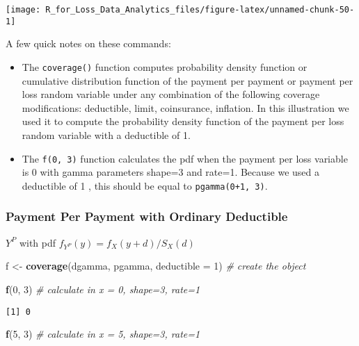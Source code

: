 \documentclass[]{book}
\newenvironment{Shaded}{\begin{snugshade}}{\end{snugshade}}
\newcommand{\KeywordTok}[1]{\textcolor[rgb]{0.13,0.29,0.53}{\textbf{#1}}}
\newcommand{\DataTypeTok}[1]{\textcolor[rgb]{0.13,0.29,0.53}{#1}}
\newcommand{\DecValTok}[1]{\textcolor[rgb]{0.00,0.00,0.81}{#1}}
\newcommand{\StringTok}[1]{\textcolor[rgb]{0.31,0.60,0.02}{#1}}
\newcommand{\CommentTok}[1]{\textcolor[rgb]{0.56,0.35,0.01}{\textit{#1}}}
\newcommand{\NormalTok}[1]{#1}
\providecommand{\tightlist}{%
  \setlength{\itemsep}{0pt}\setlength{\parskip}{0pt}}
\theoremstyle{definition}
\theoremstyle{definition}
\theoremstyle{definition}
\theoremstyle{remark}
\begin{document}
\begin{center}\texttt{[image: R\_for\_Loss\_Data\_Analytics\_files/figure-latex/unnamed-chunk-50-1]} \end{center}

A few quick notes on these commands:

\begin{itemize}
\tightlist
\item
  The \texttt{coverage()} function computes probability density function
  or cumulative distribution function of the payment per payment or
  payment per loss random variable under any combination of the
  following coverage modifications: deductible, limit, coinsurance,
  inflation. In this illustration we used it to compute the probability
  density function of the payment per loss random variable with a
  deductible of 1.
\item
  The \texttt{f(0,\ 3)} function calculates the pdf when the payment per
  loss variable is 0 with gamma parameters shape=3 and rate=1. Because
  we used a deductible of 1 , this should be equal to
  \texttt{pgamma(0+1,\ 3)}.
\end{itemize}

\subsubsection{Payment Per Payment with Ordinary
Deductible}\label{payment-per-payment-with-ordinary-deductible}

\(Y^P\) with pdf \(f_{Y^P}(y) = f_X(y+d)/S_X(d)\)

\begin{Shaded}
\begin{Highlighting}[]
\NormalTok{f <-}\StringTok{ }\KeywordTok{coverage}\NormalTok{(dgamma, pgamma, }\DataTypeTok{deductible =} \DecValTok{1}\NormalTok{) }\CommentTok{# create the object}

\KeywordTok{f}\NormalTok{(}\DecValTok{0}\NormalTok{, }\DecValTok{3}\NormalTok{) }\CommentTok{# calculate in x = 0, shape=3, rate=1}
\end{Highlighting}
\end{Shaded}

\begin{verbatim}
[1] 0
\end{verbatim}

\begin{Shaded}
\begin{Highlighting}[]
\KeywordTok{f}\NormalTok{(}\DecValTok{5}\NormalTok{, }\DecValTok{3}\NormalTok{) }\CommentTok{# calculate in x = 5, shape=3, rate=1}
\end{Highlighting}
\end{Shaded}
\end{document}

